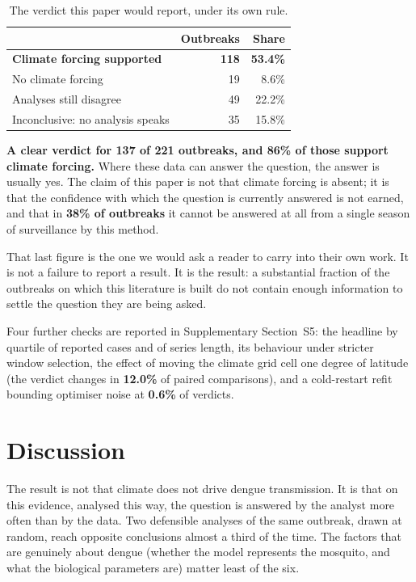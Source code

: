 \documentclass[11pt,a4paper]{article}
\begin{document}
\begin{table}[htbp]
\centering
\caption{The verdict this paper would report, under its own rule.}
\begin{tabular}{lrr}
\toprule
& Outbreaks & Share \\
\midrule
\textbf{Climate forcing supported} & \textbf{118} & \textbf{53.4\%} \\
No climate forcing & 19 & 8.6\% \\
\midrule
Analyses still disagree & 49 & 22.2\% \\
Inconclusive: no analysis speaks & 35 & 15.8\% \\
\bottomrule
\end{tabular}
\end{table}

\textbf{A clear verdict for 137 of 221 outbreaks, and 86\% of those support
climate forcing.} Where these data can answer the question, the answer is usually
yes. The claim of this paper is not that climate forcing is absent; it is that the
confidence with which the question is currently answered is not earned, and that
in \textbf{38\% of outbreaks} it cannot be answered at all from a single season of
surveillance by this method.

That last figure is the one we would ask a reader to carry into their own work. It
is not a failure to report a result. It is the result: a substantial fraction of
the outbreaks on which this literature is built do not contain enough information
to settle the question they are being asked.

Four further checks are reported in Supplementary Section~S5: the headline by
quartile of reported cases and of series length, its behaviour under stricter
window selection, the effect of moving the climate grid cell one degree of
latitude (the verdict changes in \textbf{12.0\%} of paired comparisons), and a
cold-restart refit bounding optimiser noise at \textbf{0.6\%} of verdicts.
\section{Discussion}

The result is not that climate does not drive dengue transmission. It is that on
this evidence, analysed this way, the question is answered by the analyst more
often than by the data. Two defensible analyses of the same outbreak, drawn at
random, reach opposite conclusions almost a third of the time. The factors that
are genuinely about dengue (whether the model represents the mosquito, and what
the biological parameters are) matter least of the six.
\end{document}
